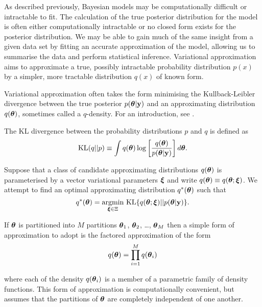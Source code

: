 As described previously, Bayesian models may be computationally difficult or
intractable to fit. The calculation of the true posterior distribution for the
model is often either computationally intractable or no closed form exists for
the posterior distribution. We may be able to gain much of the same insight from
a given data set by fitting an accurate approximation  of the model, allowing us
to summarise the data and perform statistical inference. Variational approximation aims
to approximate a true, possibly intractable probability distribution $p(x)$ by a
simpler, more tractable distribution $q(x)$ of known form.

Variational approximation often takes the form minimising the Kullback-Leibler
divergence between the true posterior $p({\boldsymbol \theta}|{\bf y})$ and an approximating
distribution $q({\boldsymbol \theta})$, sometimes called a $q$-density. For an introduction,
see \cite{Ormerod2010}.


The KL divergence between the probability distributions $p$ and $q$ is defined
as
$$
	\text{KL}(q || p) \equiv \int q({\boldsymbol \theta}) \log \left [ \frac{q({\boldsymbol \theta})}{p({\boldsymbol \theta} | {\bf y})} \right ] d {\boldsymbol \theta}.
$$

Suppose that a class of candidate approximating distributions $q({\boldsymbol \theta})$ is
parameterised by a vector variational parameters ${\boldsymbol \xi}$ and write
$q({\boldsymbol \theta})\equiv q({\boldsymbol \theta};{\boldsymbol \xi})$. We attempt to find an  optimal approximating
distribution $q^*({\boldsymbol \theta})$ such that
$$
	\ds q^*(\vtheta) = \argmin_{\vxi \in \Xi} \,  \text{KL} \{ {q(\vtheta;\vxi) || p(\vtheta|\vy)} \}.
$$

\noindent If ${\boldsymbol \theta}$ is partitioned into $M$ partitions ${\boldsymbol \theta}_1$,
${\boldsymbol \theta}_2$, \ldots, ${\boldsymbol \theta}_M$ then a simple form of approximation to adopt is
the factored approximation of the form
$$
	q({\boldsymbol \theta}) = \prod_{i=1}^M q({\boldsymbol \theta}_i)
$$

\noindent where each of the density $q({\boldsymbol \theta}_i)$ is a member of a parametric
family of density functions.  This form of approximation is computationally
convenient, but assumes that the partitions of ${\boldsymbol \theta}$ are completely
independent of one another.

